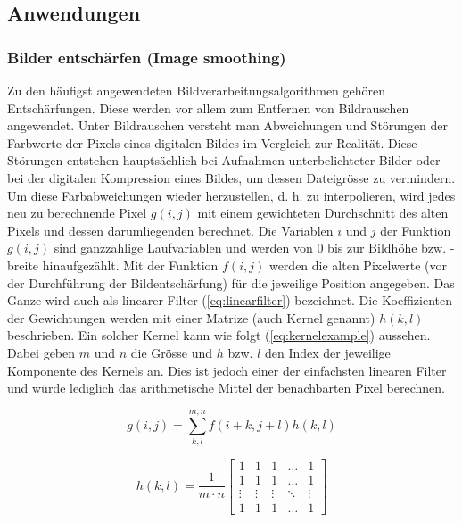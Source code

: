 \subsection{Anwendungen}

\subsubsection{Bilder entschärfen (Image smoothing)}

Zu den häufigst angewendeten Bildverarbeitungsalgorithmen gehören Entschärfungen. Diese werden vor allem zum Entfernen von Bildrauschen angewendet. Unter Bildrauschen versteht man Abweichungen und Störungen der Farbwerte der Pixels eines digitalen Bildes im Vergleich zur Realität. Diese Störungen entstehen hauptsächlich bei Aufnahmen unterbelichteter Bilder oder bei der digitalen Kompression eines Bildes, um dessen Dateigrösse zu vermindern. Um diese Farbabweichungen wieder herzustellen, d. h. zu interpolieren, wird jedes neu zu berechnende Pixel $g(i,j)$ mit einem gewichteten Durchschnitt des alten Pixels und dessen darumliegenden berechnet. Die Variablen $i$ und $j$ der Funktion $g(i,j)$ sind ganzzahlige Laufvariablen und werden von $0$ bis zur Bildhöhe bzw. -breite hinaufgezählt. Mit der Funktion $f(i,j)$ werden die alten Pixelwerte (vor der Durchführung der Bildentschärfung) für die jeweilige Position angegeben. Das Ganze wird auch als linearer Filter (\ref{eq:linearfilter}) bezeichnet. Die Koeffizienten der Gewichtungen werden mit einer Matrize (auch Kernel genannt) $h(k,l)$ beschrieben. Ein solcher Kernel kann wie folgt (\ref{eq:kernelexample}) aussehen. Dabei geben $m$ und $n$ die Grösse  und $h$ bzw. $l$ den Index der jeweilige Komponente des Kernels an. Dies ist jedoch einer der einfachsten linearen Filter und würde lediglich das arithmetische Mittel der benachbarten Pixel berechnen.  \cite{opencv_bradski_kaehler:1, opencv_doc_blur:1}

\begin{equation}
	g(i,j) = \sum_{k,l}^{m,n} f(i+k,j+l)h(k,l)
	\label{eq:linearfilter}
\end{equation}
\cite{opencv_doc_blur:1}



\begin{equation}
	h(k,l) = \frac{1}{m \cdot n}
	\begin{bmatrix}
  	1      & 1      & 1      & \dots  &      1 \\
	1      & 1      & 1      & \dots  &      1 \\
	 \vdots & \vdots & \vdots & \ddots & \vdots \\
	 1      & 1      & 1      & \dots  &      1
	\end{bmatrix}	
	\label{eq:kernelexample}
\end{equation}
\cite{opencv_doc_blur:1}

